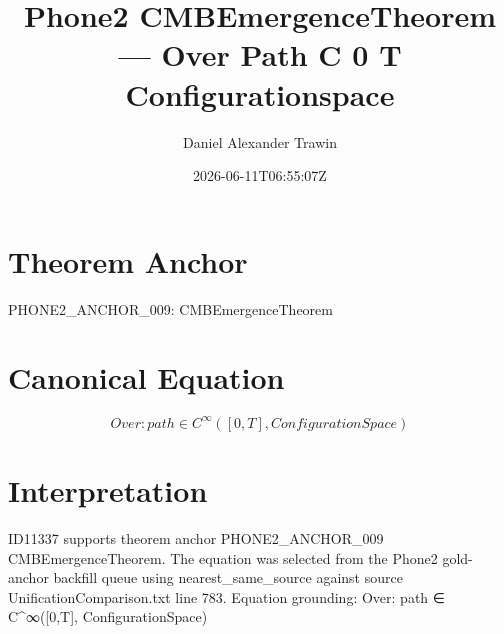 \documentclass[11pt]{article}
\title{Phone2 CMBEmergenceTheorem — Over Path C 0 T Configurationspace}
\author{Daniel Alexander Trawin}
\date{2026-06-11T06:55:07Z}
\begin{document}
\maketitle
\section*{Theorem Anchor}
PHONE2_ANCHOR_009: CMBEmergenceTheorem
\section*{Canonical Equation}
\[
Over: {path ∈ C^∞([0,T], ConfigurationSpace)}
\]
\section*{Interpretation}
ID11337 supports theorem anchor PHONE2_ANCHOR_009 CMBEmergenceTheorem. The equation was selected from the Phone2 gold-anchor backfill queue using nearest_same_source against source UnificationComparison.txt line 783. Equation grounding: Over: {path ∈ C^∞([0,T], ConfigurationSpace)}
\end{document}
